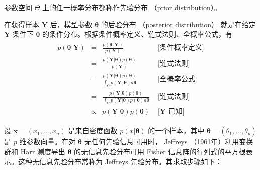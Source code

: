 \documentclass[12pt,a4paper,UTF8,twoside]{book}
\theoremstyle{definition}
\theoremstyle{definition}
\theoremstyle{definition}
\theoremstyle{remark}
\let\BeginKnitrBlock\begin \let\EndKnitrBlock\end
\begin{document}
\BeginKnitrBlock{definition}[先验分布]
\protect\hypertarget{def:prior-distribution}{}{\label{def:prior-distribution}
{} }参数空间 \(\Theta\)
上的任一概率分布都称作先验分布 （prior distribution）。
\EndKnitrBlock{definition}

\BeginKnitrBlock{definition}[后验分布]
\protect\hypertarget{def:posterior-distribution}{}{\label{def:posterior-distribution}
{} }在获得样本 \(\mathbf{Y}\) 后，模型参数
\(\boldsymbol{\theta}\) 的后验分布 （posterior distribution） 就是在给定
\(\mathbf{Y}\) 条件下 \(\boldsymbol{\theta}\)
的条件分布。根据条件概率定义、链式法则、全概率公式，有 \begin{align}
\begin{array}{rcll}
p(\boldsymbol{\theta}|\mathbf{Y})  & =  & \displaystyle \frac{p(\boldsymbol{\theta},\mathbf{Y})}{p(\mathbf{Y})}
& \mbox{ [条件概率定义]}
\\[16pt]
& = & \displaystyle \frac{p(\mathbf{Y}|\boldsymbol{\theta}) p(\boldsymbol{\theta})}{p(\mathbf{Y})}
& \mbox{ [链式法则]}
\\[16pt]
& = & \displaystyle \frac{p(\mathbf{Y}|\boldsymbol{\theta})p(\boldsymbol{\theta})}{\int_{\Theta}p(\mathbf{Y},\boldsymbol{\theta})d\boldsymbol{\theta}}
& \mbox{ [全概率公式]}
\\[16pt]
& = & \displaystyle \frac{p(\mathbf{Y}|\boldsymbol{\theta})p(\boldsymbol{\theta})}{\int_{\Theta}p(\mathbf{Y}|\boldsymbol{\theta})p(\boldsymbol{\theta})d\boldsymbol{\theta}}
& \mbox{ [链式法则]}
\\[16pt]
& \propto & \displaystyle p(\mathbf{Y}|\boldsymbol{\theta})p(\boldsymbol{\theta})
& \mbox{ [$\mathbf{Y}$ 已知]}
\end{array} \label{eq:bayes-theorem}
\end{align}
\EndKnitrBlock{definition}

\BeginKnitrBlock{definition}[Jeffreys 先验分布]
\protect\hypertarget{def:Jeffreys-prior-distribution}{}{\label{def:Jeffreys-prior-distribution}
{} }设 \(\mathbf{x} = (x_1,\ldots,x_n)\)
是来自密度函数 \(p(x|\boldsymbol{\theta})\) 的一个样本，其中
\(\boldsymbol{\theta} = (\theta_1,\ldots,\theta_p)\) 是 \(p\)
维参数向量。在对 \(\boldsymbol{\theta}\) 无任何先验信息可用时， Jeffreys
（1961年）利用变换群和 Harr 测度导出 \(\boldsymbol{\theta}\)
的无信息先验分布可用 Fisher
信息阵的行列式的平方根表示。这种无信息先验分布常称为 Jeffreys
先验分布。其求取步骤如下：
\EndKnitrBlock{definition}
\end{document}
